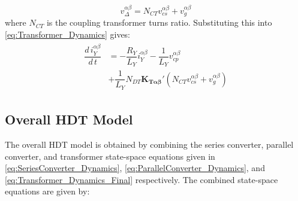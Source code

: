 \begin{equation}
    v_{\Delta}^{\alpha\beta} = N_{CT}v_{cs}^{\alpha\beta} + v_g^{\alpha\beta}
\end{equation}
where $N_{CT}$ is the coupling transformer turns ratio. Substituting this into \cref{eq:Transformer_Dynamics} gives:
\begin{align}
    \begin{aligned}
        \dfrac{d\,i_Y^{\alpha\beta}}{d\,t} &= -\dfrac{R_Y}{L_Y}i_Y^{\alpha\beta} - \dfrac{1}{L_Y}v_{cp}^{\alpha\beta}\\
        &+ \dfrac{1}{L_Y}N_{DT}\mathbf{K_{T\alpha\beta}}'\left(N_{CT}v_{cs}^{\alpha\beta} + v_g^{\alpha\beta}\right) \label{eq:Transformer_Dynamics_Final}
    \end{aligned}
\end{align}

\subsection{Overall HDT Model}
The overall HDT model is obtained by combining the series converter, parallel converter, and transformer state-space equations given in \eqref{eq:SeriesConverter_Dynamics}, \eqref{eq:ParallelConverter_Dynamics}, and \eqref{eq:Transformer_Dynamics_Final} respectively. The combined state-space equations are given by:

